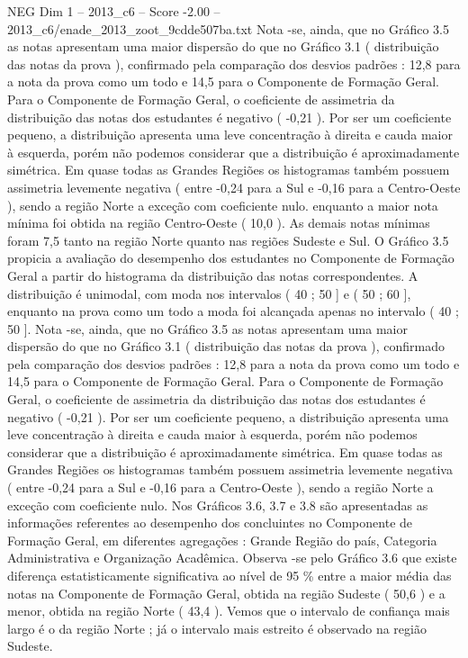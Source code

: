 \begin{textsample}{NEG Dim 1 – 2013\_c6 – Score -2.00 – 2013\_c6/enade\_2013\_zoot\_9cdde507ba.txt}
Nota -se, ainda, que no Gráfico 3.5 as notas apresentam uma maior dispersão do que no Gráfico 3.1 ( distribuição das notas da prova ), confirmado pela comparação dos desvios padrões : 12,8 para a nota da prova como um todo e 14,5 para o Componente de Formação Geral.
Para o Componente de Formação Geral, o coeficiente de assimetria da distribuição das notas dos estudantes é negativo ( -0,21 ).
Por ser um coeficiente pequeno, a distribuição apresenta uma leve concentração à direita e cauda maior à esquerda, porém não podemos considerar que a distribuição é aproximadamente simétrica.
Em quase todas as Grandes Regiões os histogramas também possuem assimetria levemente negativa ( entre -0,24 para a Sul e -0,16 para a Centro-Oeste ), sendo a região Norte a exceção com coeficiente nulo. enquanto a maior nota mínima foi obtida na região Centro-Oeste ( 10,0 ).
As demais notas mínimas foram 7,5 tanto na região Norte quanto nas regiões Sudeste e Sul.
O Gráfico 3.5 propicia a avaliação do desempenho dos estudantes no Componente de Formação Geral a partir do histograma da distribuição das notas correspondentes.
A distribuição é unimodal, com moda nos intervalos ( 40 ; 50 ] e ( 50 ; 60 ], enquanto na prova como um todo a moda foi alcançada apenas no intervalo ( 40 ; 50 ].
Nota -se, ainda, que no Gráfico 3.5 as notas apresentam uma maior dispersão do que no Gráfico 3.1 ( distribuição das notas da prova ), confirmado pela comparação dos desvios padrões : 12,8 para a nota da prova como um todo e 14,5 para o Componente de Formação Geral.
Para o Componente de Formação Geral, o coeficiente de assimetria da distribuição das notas dos estudantes é negativo ( -0,21 ).
Por ser um coeficiente pequeno, a distribuição apresenta uma leve concentração à direita e cauda maior à esquerda, porém não podemos considerar que a distribuição é aproximadamente simétrica.
Em quase todas as Grandes Regiões os histogramas também possuem assimetria levemente negativa ( entre -0,24 para a Sul e -0,16 para a Centro-Oeste ), sendo a região Norte a exceção com coeficiente nulo.
Nos Gráficos 3.6, 3.7 e 3.8 são apresentadas as informações referentes ao desempenho dos concluintes no Componente de Formação Geral, em diferentes agregações : Grande Região do país, Categoria Administrativa e Organização Acadêmica.
Observa -se pelo Gráfico 3.6 que existe diferença estatisticamente significativa ao nível de 95 \% entre a maior média das notas na Componente de Formação Geral, obtida na região Sudeste ( 50,6 ) e a menor, obtida na região Norte ( 43,4 ).
Vemos que o intervalo de confiança mais largo é o da região Norte ; já o intervalo mais estreito é observado na região Sudeste.

\end{textsample}
